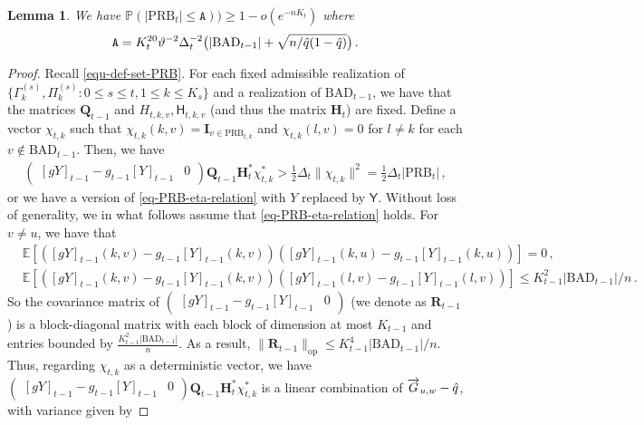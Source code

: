 \documentclass[11pt]{article}
\newtheorem{Lemma}[Theorem]{Lemma}
\numberwithin{equation}{section}
\begin{document}
\begin{Lemma} {\label{lemma-bound-cardinality-set-PRB}}
We have $\mathbb P(|\mathrm{PRB}_t| \leq \mathtt A )) \geq 1-o(e^{-n K_t})$ where
\begin{align*}
    \mathtt A =  K_t^{20} \vartheta^{-2} \Delta_{t}^{-2} \big( |\mathrm{BAD}_{t-1}| + \sqrt{n /\Hat{q}(1-\Hat{q})} \big) \,.
\end{align*}
\end{Lemma}
\begin{proof}
Recall \eqref{equ-def-set-PRB}.
For each fixed admissible realization of $\{ \Gamma^{(s)}_k, \Pi^{(s)}_k : 0 \leq s \leq t, 1 \leq k \leq K_s \}$ and a realization of $\mathrm{BAD}_{t-1}$, we have that the matrices $\mathbf{Q}_{t-1}$ and $H_{t,k,v},\mathsf{H}_{t,k,v}$ (and thus the matrix $\mathbf{H}_t$) are fixed. Define a vector $\chi_{t, k}$ such that $\chi_{t,k}(k,v)= \mathbf{I}_{v \in \mathrm{PRB}_{t,k}}$ and $\chi_{t,k}(l,v)=0$ for $l \neq k$ for each $v \not \in \mathrm{BAD}_{t-1}$. Then, we have
\begin{align}\label{eq-PRB-eta-relation}
    \begin{pmatrix}
        [g Y]_{t-1} - g_{t-1} [Y]_{t-1} & 0
    \end{pmatrix} \mathbf{Q}_{t-1} \mathbf{H}_{t}^{*} \chi^{*}_{t,k} > \tfrac{1}{2} \Delta_{t} \| \chi_{t,k} \|^2  = \tfrac{1}{2} \Delta_{t}|\mathrm{PRB}_t| \,,
\end{align}
or we have a version of \eqref{eq-PRB-eta-relation} with $Y$ replaced by $\mathsf Y$. Without loss of generality, we in what follows assume that \eqref{eq-PRB-eta-relation} holds. 
For $v \neq u$, we have that
\begin{align*}
    & \mathbb{E}[ ([g Y]_{t-1}(k,v) - g_{t-1} [Y]_{t-1}(k,v)) ([g Y]_{t-1}(k,u) - g_{t-1} [Y]_{t-1}(k,u)) ] = 0 \,, \\
    & \mathbb{E}[ ([g Y]_{t-1}(k,v) - g_{t-1} [Y]_{t-1}(k,v)) ([g Y]_{t-1}(l,v) - g_{t-1} [Y]_{t-1}(l,v)) ] \leq K_{t-1}^2 |\mathrm{BAD}_{t-1}|/n  \,.
\end{align*}
So the covariance matrix of $\begin{pmatrix} [g Y]_{t-1} - g_{t-1} [Y]_{t-1} & 0 \end{pmatrix}$ (we denote as $\mathbf{R}_{t-1}$) is a block-diagonal matrix with each block of dimension at most $K_{t-1}$ and entries bounded by $\frac{K_{t-1}^2|\mathrm{BAD}_{t-1}|}{n}$. As a result, $\|\mathbf{R}_{t-1}\|_{\mathrm{op}} \leq K_{t-1}^4 |\mathrm{BAD}_{t-1}|/n$. Thus, regarding $\chi_{t,k}$ as a deterministic vector, we have $\begin{pmatrix} [g Y]_{t-1} - g_{t-1} [Y]_{t-1} & 0 \end{pmatrix} \mathbf{Q}_{t-1} \mathbf{H}_{t}^{*} \chi^{*}_{t,k}$ is a linear combination of $\overrightarrow{G}_{u,w}-\Hat{q}$, with variance given by 

\end{proof}
\end{document}
